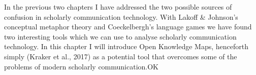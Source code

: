 In the previous two chapters I have addressed the two possible sources of confusion in scholarly communication technology. With Lakoff & Johnson’s conceptual metaphor theory and Coeckelbergh’s language games we have found two interesting tools which we can use to analyse scholarly communication technology. In this chapter I will introduce Open Knowledge Maps, henceforth simply (Kraker et al., 2017) as a potential tool that overcomes some of the problems of modern scholarly communication.OK